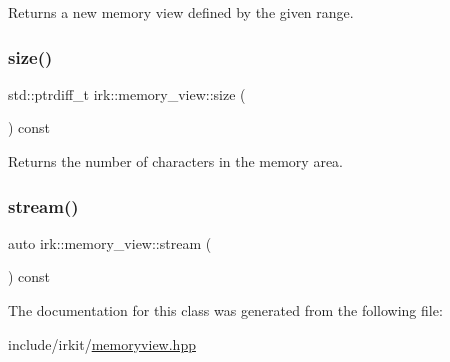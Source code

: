 Returns a new memory view defined by the given range. 

\mbox{\label{classirk_1_1memory__view_af9ae4528f4f33cf24ab65115f96b7e18}} 
\subsubsection{\texorpdfstring{size()}{size()}}
{\footnotesize\ttfamily std\+::ptrdiff\+\_\+t irk\+::memory\+\_\+view\+::size (\begin{DoxyParamCaption}{ }\end{DoxyParamCaption}) const\hspace{0.3cm}{\ttfamily [inline]}}



Returns the number of characters in the memory area. 

\mbox{\label{classirk_1_1memory__view_a4e324d9edda27a3125d2ab364d1e5552}} 
\subsubsection{\texorpdfstring{stream()}{stream()}}
{\footnotesize\ttfamily auto irk\+::memory\+\_\+view\+::stream (\begin{DoxyParamCaption}{ }\end{DoxyParamCaption}) const\hspace{0.3cm}{\ttfamily [inline]}}



The documentation for this class was generated from the following file\+:\begin{DoxyCompactItemize}
\item 
include/irkit/\mbox{\hyperlink{memoryview_8hpp}{memoryview.\+hpp}}\end{DoxyCompactItemize}

